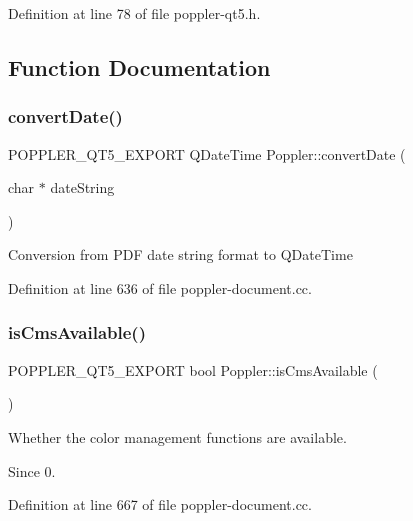 Definition at line 78 of file poppler-\/qt5.\+h.



\subsection{Function Documentation}
\mbox{\label{namespace_poppler_a80926c85a77588d71bc0b9dd70f1d6c1}} 
\subsubsection{\texorpdfstring{convert\+Date()}{convertDate()}}
{\footnotesize\ttfamily P\+O\+P\+P\+L\+E\+R\+\_\+\+Q\+T5\+\_\+\+E\+X\+P\+O\+RT Q\+Date\+Time Poppler\+::convert\+Date (\begin{DoxyParamCaption}\item[{char $\ast$}]{date\+String }\end{DoxyParamCaption})}

Conversion from P\+DF date string format to Q\+Date\+Time 

Definition at line 636 of file poppler-\/document.\+cc.

\mbox{\label{namespace_poppler_a21ef0e2c0c9cfed4548570f8d9c47879}} 
\subsubsection{\texorpdfstring{is\+Cms\+Available()}{isCmsAvailable()}}
{\footnotesize\ttfamily P\+O\+P\+P\+L\+E\+R\+\_\+\+Q\+T5\+\_\+\+E\+X\+P\+O\+RT bool Poppler\+::is\+Cms\+Available (\begin{DoxyParamCaption}{ }\end{DoxyParamCaption})}

Whether the color management functions are available.

\begin{DoxySince}{Since}
0. 
\end{DoxySince}


Definition at line 667 of file poppler-\/document.\+cc.

\mbox{\label{namespace_poppler_a0707427249c4a5410c4f94fcbf6eae12}} 
